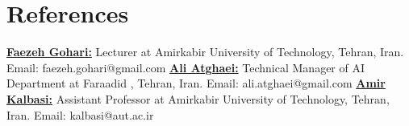 \documentclass[a4paper,12pt]{article}
\begin{document}
\section{References}
\textbf{\href{https://scholar.google.com/citations?user=7bpNAlAAAAAJ&hl=en}{Faezeh Gohari:}} Lecturer at Amirkabir University of Technology, Tehran, Iran.
\newline Email: faezeh.gohari@gmail.com \newline
\textbf{\href{https://scholar.google.com/citations?user=a_mSCasAAAAJ&hl=en&oi=ao}{Ali Atghaei:}} Technical Manager of AI Department at Faraadid , Tehran, Iran.
\newline Email: ali.atghaei@gmail.com \newline
\textbf{\href{https://scholar.google.com/citations?user=oISEZIUAAAAJ&hl=en&oi=ao}{Amir Kalbasi:}} Assistant Professor at Amirkabir University of Technology, Tehran, Iran.
\newline Email: kalbasi@aut.ac.ir \newline
\end{document}
